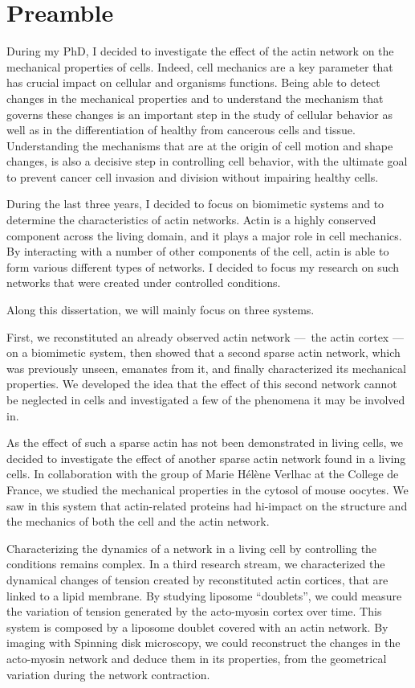 \documentclass[A4paperpaper,11pt,english]{sphinxmanual}
\begin{document}
\chapter*{Preamble}
         
\label{index-latex:preamble}\label{index-latex::doc}
During my PhD, I decided to investigate the effect of the actin network on the
mechanical properties of cells. Indeed, cell mechanics are a key parameter that
has crucial impact on cellular and organisms functions. Being able to detect
changes in the mechanical properties and to understand the mechanism that
governs these changes is an important step in the study of cellular behavior as
well as in the differentiation of healthy from cancerous cells and tissue.
Understanding the mechanisms that are at the origin of cell motion and shape
changes, is also a decisive step in controlling cell behavior, with the ultimate
goal to prevent cancer cell invasion and division without impairing healthy
cells.

During the last three years, I decided to focus on biomimetic systems and
to determine the characteristics of actin networks. Actin is a highly conserved
component across the living domain, and it plays a major role in cell
mechanics. By interacting with a number of other components of the cell, actin
is able to form various different types of networks. I decided to focus my research on such networks that were created under
controlled conditions.

Along this dissertation, we will mainly focus on three systems.

First, we reconstituted an already observed actin network — the actin
cortex — on a biomimetic system, then showed that a
second sparse actin network, which was previously unseen, emanates from it, and finally characterized its mechanical
properties. We developed the idea that the effect of this second network cannot
be neglected in cells and investigated a few of the phenomena it may be involved
in.

As the effect of such a sparse actin has not been demonstrated in living cells, we decided to
investigate the effect of another sparse actin network found in a living cells. In
collaboration with the group of Marie Hélène Verlhac at the College de France, we studied the mechanical properties
in the cytosol of mouse oocytes. We saw in this system that actin-related proteins had
hi-impact on the structure and the mechanics of both the cell and the actin
network.

Characterizing the dynamics of a network in a living cell by controlling the
conditions remains complex.  In a third research stream, we characterized the dynamical changes of tension created by reconstituted actin
cortices, that are linked to a lipid
membrane. By studying liposome ``doublets'', we could measure the variation of tension generated by the acto-myosin cortex over
time. This system is composed by a liposome doublet covered with
an actin network. By imaging with Spinning disk microscopy, we could
reconstruct the changes in the acto-myosin network and deduce them in its
properties, from the geometrical variation during the network contraction.
\end{document}
